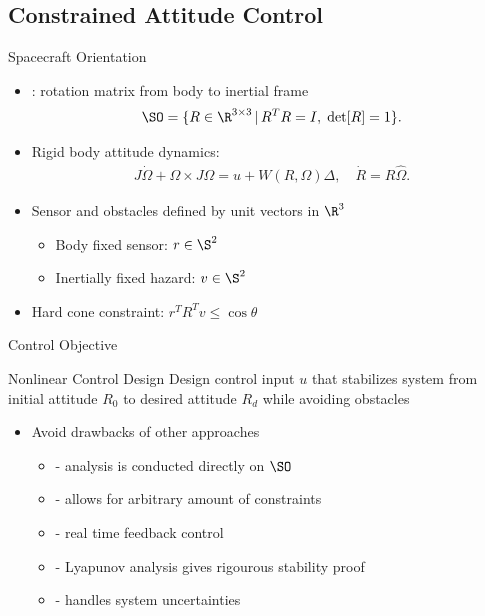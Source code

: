 \subsection[Attitude Control]{Constrained Attitude Control}



\begin{frame}{Spacecraft Orientation} %

\begin{itemize}

    \item {}: rotation matrix from body to inertial frame
     \[\SO =  \{R\in\R^{3\times 3}\,|\, R^TR=I,\;\mathrm{det}[R]=1\} . \]
    \item Rigid body attitude dynamics:
    \begin{gather*}
        J\dot\Omega + \Omega\times J\Omega = u+W(R,\Omega)\Delta , \quad \dot R = R\hat\Omega .
    \end{gather*}

    \item Sensor and obstacles defined by unit vectors in \( \R^3 \) 
        \begin{itemize}
            \item Body fixed sensor: \( r \in \S^2\)
            \item Inertially fixed hazard: \( v \in \S^2 \)
        \end{itemize} 
    \vs
    \item Hard cone constraint: \( r^T R^T v \leq \cos \theta \)
    
\end{itemize}
\end{frame}   %

\begin{frame}{Control Objective} %

    \begin{block}{Nonlinear Control Design}
        Design control input \( u \) that stabilizes system from initial attitude \( R_0 \) to desired attitude \( R_d \) while avoiding obstacles
    \end{block}
    \pause
    \vs
    \begin{itemize}
        \item Avoid drawbacks of other approaches 
        \begin{itemize}
            \item {} - analysis is conducted directly on \( \SO \) 
            \item {} - allows for arbitrary amount of constraints
            \item {} - real time feedback control
            \item {} - Lyapunov analysis gives rigourous stability proof
            \item {} - handles system uncertainties
        \end{itemize}
    \end{itemize}
\end{frame}

